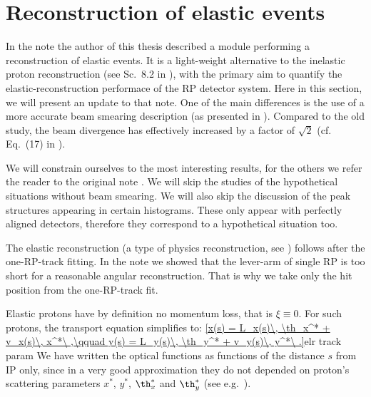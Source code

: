 
\section[elr]{Reconstruction of elastic events}

In the note  the author of this thesis described a module performing a reconstruction of elastic events. It is a light-weight alternative to the inelastic proton reconstruction (see Sc.~8.2 in ), with the primary aim to quantify the elastic-reconstruction performace of the RP detector system. Here in this section, we will present an update to that note. One of the main differences is the use of a more accurate beam smearing description (as presented in ). Compared to the old study, the beam divergence has effectively increased by a factor of $\sqrt 2$ (cf. Eq.~(17) in ).

We will constrain ourselves to the most interesting results, for the others we refer the reader to the original note . We will skip the studies of the hypothetical situations without beam smearing. We will also skip the discussion of the peak structures appearing in certain histograms. These only appear with perfectly aligned detectors, therefore they correspond to a hypothetical situation too.

The elastic reconstruction (a type of physics reconstruction, see ) follows after the one-RP-track fitting. In the note  we showed that the lever-arm of single RP is too short for a reasonable angular reconstruction. That is why we take only the hit position from the one-RP-track fit.

Elastic protons have by definition no momentum loss, that is $\xi \equiv 0$. For such protons, the transport equation  simplifies to:
\eqref{x(s) = L_x(s)\, \th_x^* + v_x(s)\, x^*\ ,\qquad y(s) = L_y(s)\, \th_y^* + v_y(s)\, y^*\ .}{elr track param}
We have written the optical functions as functions of the distance $s$ from IP only, since in a very good approximation they do not depended on proton's scattering parameters $x^*$, $y^*$, $\th^*_x$ and $\th^*_y$ (see e.g.~).

